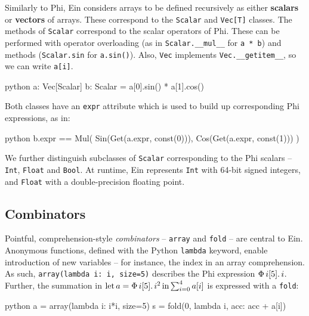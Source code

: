 Similarly to Phi, Ein considers arrays to be defined recursively as either \textbf{scalars} or \textbf{vectors} of arrays. These correspond to the \texttt{Scalar} and \texttt{Vec[T]} classes. The methods of \texttt{Scalar} correspond to the scalar operators of Phi. These can be performed with operator overloading (as in \texttt{Scalar.\_\_mul\_\_} for \texttt{a * b}) and methods (\texttt{Scalar.sin} for \texttt{a.sin()}). Also, \texttt{Vec} implements \texttt{Vec.\_\_getitem\_\_}, so we can write \texttt{a[i]}. 
\begin{center}
\begin{cminted}{python}
a: Vec[Scalar]
b: Scalar = a[0].sin() * a[1].cos()
\end{cminted}
\end{center}
Both classes have an \texttt{expr} attribute which is used to build up corresponding Phi expressions, as in: 
\begin{center}
\begin{cminted}{python}
b.expr == Mul(
    Sin(Get(a.expr, const(0))), 
    Cos(Get(a.expr, const(1)))
)
\end{cminted}
\end{center}

We further distinguish subclasses of \texttt{Scalar} corresponding to the Phi scalars -- \texttt{Int}, \texttt{Float} and \texttt{Bool}. At runtime, Ein represents \texttt{Int} with 64-bit signed integers, and \texttt{Float} with a double-precision floating point. 

\subsection{Combinators}

Pointful, comprehension-style \textit{combinators} -- \texttt{array} and \texttt{fold} -- are central to Ein. Anonymous functions, defined with the Python \texttt{lambda} keyword, enable introduction of new variables -- for instance, the index in an array comprehension. As such, \texttt{array(lambda i: i, size=5)} describes the Phi expression $\Phi\, {i}[{5}] \ldotp {i}$. Further, the summation in $\mathrm{let}\,{a}={\Phi\, {i}[{5}] \ldotp {i^2}}\,\mathrm{in}\,{ \sum_{i=0}^{4} a[i]}$ is expressed with a \texttt{fold}:
\begin{center}
\begin{cminted}{python}
a = array(lambda i: i*i, size=5)
s = fold(0, lambda i, acc: acc + a[i])
\end{cminted}
\end{center}

